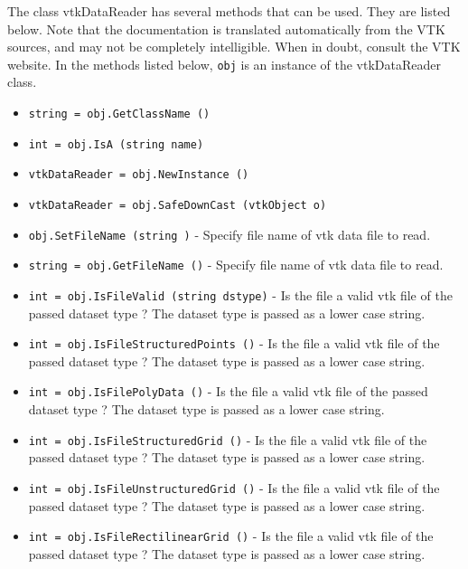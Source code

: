 The class vtkDataReader has several methods that can be used.
  They are listed below.
Note that the documentation is translated automatically from the VTK sources,
and may not be completely intelligible.  When in doubt, consult the VTK website.
In the methods listed below, \verb|obj| is an instance of the vtkDataReader class.
\begin{itemize}
\item  \verb|string = obj.GetClassName ()|

\item  \verb|int = obj.IsA (string name)|

\item  \verb|vtkDataReader = obj.NewInstance ()|

\item  \verb|vtkDataReader = obj.SafeDownCast (vtkObject o)|

\item  \verb|obj.SetFileName (string )| -  Specify file name of vtk data file to read.

\item  \verb|string = obj.GetFileName ()| -  Specify file name of vtk data file to read.

\item  \verb|int = obj.IsFileValid (string dstype)| -  Is the file a valid vtk file of the passed dataset type ?
 The dataset type is passed as a lower case string.

\item  \verb|int = obj.IsFileStructuredPoints ()| -  Is the file a valid vtk file of the passed dataset type ?
 The dataset type is passed as a lower case string.

\item  \verb|int = obj.IsFilePolyData ()| -  Is the file a valid vtk file of the passed dataset type ?
 The dataset type is passed as a lower case string.

\item  \verb|int = obj.IsFileStructuredGrid ()| -  Is the file a valid vtk file of the passed dataset type ?
 The dataset type is passed as a lower case string.

\item  \verb|int = obj.IsFileUnstructuredGrid ()| -  Is the file a valid vtk file of the passed dataset type ?
 The dataset type is passed as a lower case string.

\item  \verb|int = obj.IsFileRectilinearGrid ()| -  Is the file a valid vtk file of the passed dataset type ?
 The dataset type is passed as a lower case string.


\end{itemize}
